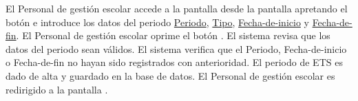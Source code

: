  \begin{UCtrayectoria}
 
     \UCpaso[\UCactor] El Personal de gestión escolar accede a la pantalla \label{CU25.introduceDatos} desde la pantalla  apretando el botón e introduce los datos del periodo \hyperlink{Periodo de ETS.Periodo }{Periodo}, \hyperlink{Periodo de ETS.Tipo }{Tipo}, \hyperlink{Periodo de ETS.Fecha-de-inicio }{Fecha-de-inicio} y \hyperlink{Periodo de ETS.Fecha-de-fin }{Fecha-de-fin}.
     \UCpaso[\UCactor] El Personal de gestión escolar oprime el botón .
     \UCpaso El sistema revisa que los datos del periodo sean válidos.
     \UCpaso El sistema verifica que el Periodo, Fecha-de-inicio o Fecha-de-fin no hayan sido registrados con anterioridad.
     \UCpaso El periodo de ETS es dado de alta y guardado en la base de datos.
     \UCpaso[\UCactor] El Personal de gestión escolar es redirigido a la pantalla .
 
 \end{UCtrayectoria}
 